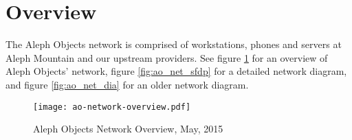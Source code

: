 %
%
%
%
%

\section{Overview}
The Aleph Objects network is comprised of workstations, phones and servers at
Aleph Mountain and our upstream providers. See figure
\ref{fig:ao_net_overview} for an overview of Aleph Objects' network,
figure \ref{fig:ao_net_sfdp} for a detailed network diagram, and
figure \ref{fig:ao_net_dia} for an older network diagram.

\begin{figure}[h!]
\texttt{[image: ao-network-overview.pdf]}
 \caption{Aleph Objects Network Overview, May, 2015}
 \label{fig:ao_net_overview}
\end{figure}


